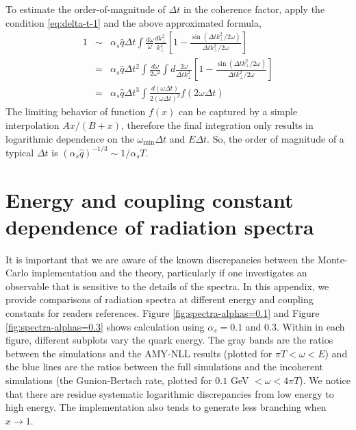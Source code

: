 \documentclass[aps, prc, reprint, amsmath, groupedaddress, nofootinbib]{revtex4-1}
\begin{document}
To estimate the order-of-magnitude of $\Delta t$ in the coherence factor, apply the condition \ref{eq:delta-t-1} and the above approximated formula,
\begin{eqnarray}
\nonumber
1 &\sim& \alpha_s\hat{q}\Delta t \int \frac{d\omega}{\omega}  \frac{dk_\perp^2}{k_\perp^4}  \left[1-\frac{\sin(\Delta t k_\perp^2/2\omega)}{\Delta t k_\perp^2/2\omega}\right]\\
\nonumber
&=& \alpha_s\hat{q}\Delta t^2 \int \frac{d\omega}{2\omega^2}  \int d\frac{2\omega}{\Delta t k_\perp^2}  \left[1-\frac{\sin(\Delta t k_\perp^2/2\omega)}{\Delta t k_\perp^2/2\omega}\right]\\
&=& \alpha_s\hat{q}\Delta t^3 \int \frac{d(\omega\Delta t)}{2(\omega\Delta t) ^2} f(2\omega\Delta t)
\end{eqnarray}
The limiting behavior of function $f(x)$ can be captured by a simple interpolation $Ax/(B+x)$, therefore the final integration only results in logarithmic dependence on the $\omega_{\min}\Delta t$ and $E\Delta t$.
So, the order of magnitude of a typical $\Delta t$ is $(\alpha_s\hat{q})^{-1/3}\sim 1/\alpha_s T$.


\section{Energy and coupling constant dependence of radiation spectra}\label{app:tune-spectrum}
It is important that we are aware of the known discrepancies between the Monte-Carlo implementation and the theory, particularly if one investigates an observable that is sensitive to the details of the spectra. 
In this appendix, we provide comparisons of radiation spectra at different energy and coupling constants for readers references.
Figure \ref{fig:spectra-alphas=0.1} and Figure \ref{fig:spectra-alphas=0.3} shows calculation using $\alpha_s = 0.1$ and $0.3$.
Within in each figure, different subplots vary the quark energy.
The gray bands are the ratios between the simulations and the AMY-NLL results (plotted for $\pi T < \omega < E$) and the blue lines are the ratios between the full simulations and the incoherent simulations (the Gunion-Bertsch rate, plotted for $0.1$ GeV $< \omega < 4\pi T $).
We notice that there are residue systematic logarithmic discrepancies from low energy to high energy.
The implementation also tends to generate less branching when $x \rightarrow 1$.

 
\end{document}
